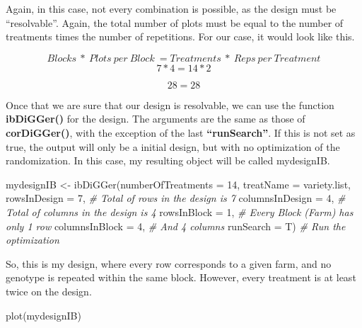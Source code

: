 \documentclass[
]{book}
\newenvironment{Shaded}{\begin{snugshade}}{\end{snugshade}}
\newcommand{\AttributeTok}[1]{\textcolor[rgb]{0.77,0.63,0.00}{#1}}
\newcommand{\CommentTok}[1]{\textcolor[rgb]{0.56,0.35,0.01}{\textit{#1}}}
\newcommand{\DecValTok}[1]{\textcolor[rgb]{0.00,0.00,0.81}{#1}}
\newcommand{\FunctionTok}[1]{\textcolor[rgb]{0.00,0.00,0.00}{#1}}
\newcommand{\NormalTok}[1]{#1}
\newcommand{\OtherTok}[1]{\textcolor[rgb]{0.56,0.35,0.01}{#1}}
\begin{document}
Again, in this case, not every combination is possible, as the design must be ``resolvable''. Again, the total number of plots must be equal to the number of treatments times the number of repetitions. For our case, it would look like this.

\[
Blocks\ *\ Plots\ per\  Block\  = Treatments\  *\  Reps\  per\  Treatment  
\]
\[
7*4 = 14*2
\]

\[
28 = 28
\]

Once that we are sure that our design is resolvable, we can use the function \textbf{ibDiGGer()} for the design. The arguments are the same as those of \textbf{corDiGGer()}, with the exception of the last \textbf{``runSearch''}. If this is not set as true, the output will only be a initial design, but with no optimization of the randomization. In this case, my resulting object will be called mydesignIB.

\begin{Shaded}
\begin{Highlighting}[]
\NormalTok{mydesignIB }\OtherTok{\textless{}{-}} \FunctionTok{ibDiGGer}\NormalTok{(}\AttributeTok{numberOfTreatments =} \DecValTok{14}\NormalTok{,}
                  \AttributeTok{treatName =}\NormalTok{ variety.list,}
                  \AttributeTok{rowsInDesign =} \DecValTok{7}\NormalTok{,         }\CommentTok{\# Total of rows in the design is 7}
                  \AttributeTok{columnsInDesign =} \DecValTok{4}\NormalTok{,      }\CommentTok{\# Total of columns in the design is 4}
                  \AttributeTok{rowsInBlock =} \DecValTok{1}\NormalTok{,          }\CommentTok{\# Every Block (Farm) has only 1 row}
                  \AttributeTok{columnsInBlock =} \DecValTok{4}\NormalTok{,       }\CommentTok{\# And 4 columns}
                  \AttributeTok{runSearch =}\NormalTok{ T)            }\CommentTok{\# Run the optimization }
\end{Highlighting}
\end{Shaded}

So, this is my design, where every row corresponds to a given farm, and no genotype is repeated within the same block. However, every treatment is at least twice on the design.

\begin{Shaded}
\begin{Highlighting}[]
\FunctionTok{plot}\NormalTok{(mydesignIB)}
\end{Highlighting}
\end{Shaded}
\end{document}
